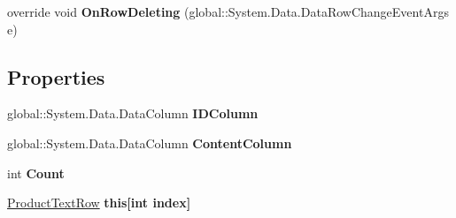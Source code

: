 \begin{DoxyCompactItemize}
\item 
override void {\bfseries On\+Row\+Deleting} (global\+::\+System.\+Data.\+Data\+Row\+Change\+Event\+Args e)\hypertarget{class_products_1_1_data_1_1ds_sage_1_1_product_text_data_table_a3f0260cad10b24652d4937e5883bd3ba}{}\label{class_products_1_1_data_1_1ds_sage_1_1_product_text_data_table_a3f0260cad10b24652d4937e5883bd3ba}

\end{DoxyCompactItemize}
\subsection*{Properties}
\begin{DoxyCompactItemize}
\item 
global\+::\+System.\+Data.\+Data\+Column {\bfseries I\+D\+Column}\hypertarget{class_products_1_1_data_1_1ds_sage_1_1_product_text_data_table_aaea141b11a5edb6088993cdd3ba03dec}{}\label{class_products_1_1_data_1_1ds_sage_1_1_product_text_data_table_aaea141b11a5edb6088993cdd3ba03dec}

\item 
global\+::\+System.\+Data.\+Data\+Column {\bfseries Content\+Column}\hypertarget{class_products_1_1_data_1_1ds_sage_1_1_product_text_data_table_ac3aadd119e99bb89a645c8b1f890aec4}{}\label{class_products_1_1_data_1_1ds_sage_1_1_product_text_data_table_ac3aadd119e99bb89a645c8b1f890aec4}

\item 
int {\bfseries Count}\hypertarget{class_products_1_1_data_1_1ds_sage_1_1_product_text_data_table_a51c2b24138eaf4d68bc8c52c869c9560}{}\label{class_products_1_1_data_1_1ds_sage_1_1_product_text_data_table_a51c2b24138eaf4d68bc8c52c869c9560}

\item 
\hyperlink{class_products_1_1_data_1_1ds_sage_1_1_product_text_row}{Product\+Text\+Row} {\bfseries this\mbox{[}int index\mbox{]}}\hypertarget{class_products_1_1_data_1_1ds_sage_1_1_product_text_data_table_a39e039466274ce80912d73d28f831709}{}\label{class_products_1_1_data_1_1ds_sage_1_1_product_text_data_table_a39e039466274ce80912d73d28f831709}

\end{DoxyCompactItemize}
